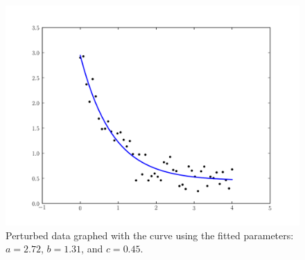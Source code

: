 \begin{figure}
\includegraphics[width=\textwidth]{curve_fit.pdf}
\caption{Perturbed data graphed with the curve using the fitted parameters: $a=2.72$,  $b=1.31$, and $c=0.45$.}
\label{opt:curve_fit}
\end{figure}


